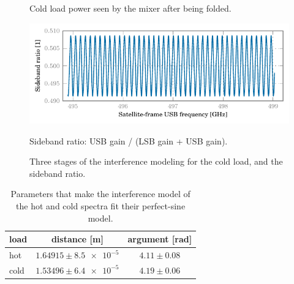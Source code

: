 \begin{figure}
    \vspace{-1.1em}
    \caption*{Cold load power seen by the mixer after being folded.}
    \medskip
    \includegraphics{mars_25_interf_sbr_cold}
    \vspace{-1.1em}
    \caption*{Sideband ratio: USB gain / (LSB gain + USB gain).}
    \caption{Three stages of the interference modeling for the cold load, and the sideband ratio.}
    \label{fig:mars_interf_stages_cold}
\end{figure}
\begin{table}
    \centering
    \begin{tabular}{l c c}
        \toprule
            load
            &
            distance [\si{\meter}]
            &
            argument [\si{\radian}] \\
        \midrule
            hot  & $\num{1.64915} \pm \num{8.5e-5}$    &    $\num{4.11} \pm \num{0.08}$ \\
            cold & $\num{1.53496} \pm \num{6.4e-5}$    &    $\num{4.19} \pm \num{0.06}$ \\
        \bottomrule
    \end{tabular}
    \caption{
        Parameters that make the interference model of the hot and cold spectra fit
        their perfect-sine model.
    }
    \label{tab:interf_vs_perfectsine}
\end{table}
